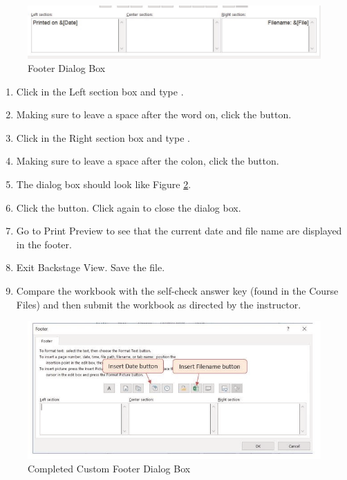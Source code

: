 \begin{figure}[H]
	\centering
	\includegraphics[width=\maxwidth{.95\linewidth}]{gfx/ch02_fig45}
	\caption{Footer Dialog Box}
	\label{02:fig45}
\end{figure}


\begin{enumerate}
	\item Click in the Left section box and type .
	\item Making sure to leave a space after the word on, click the  button.
	\item Click in the Right section box and type .
	\item Making sure to leave a space after the colon, click the  button.
	\item The  dialog box should look like Figure \ref{02:fig46}.
	\item Click the  button. Click  again to close the  dialog box.
	\item Go to Print Preview to see that the current date and file name are displayed in the footer.
	\item Exit Backstage View. Save the  file.
	\item Compare the workbook with the self-check answer key (found in the Course Files) and then submit the  workbook as directed by the instructor.
\end{enumerate}

\begin{figure}[H]
	\centering
	\includegraphics[width=\maxwidth{.95\linewidth}]{gfx/ch02_fig46}
	\caption{Completed Custom Footer Dialog Box}
	\label{02:fig46}
\end{figure}

